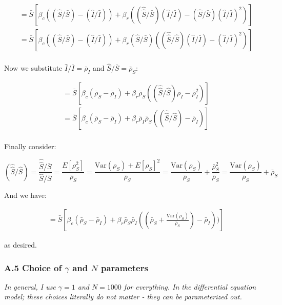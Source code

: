 \[
\begin{aligned}
&= \bar S \left[ \beta_c ((\hat S/\bar S) - (\hat I/\bar I))
    + \beta_r ((\hat{\hat S} / \bar S) (\hat I / \bar I)
    - (\hat S / \bar S) (\hat I / \bar I )^2) \right ]\\
&= \bar S \left[ \beta_c ((\hat S/\bar S) - (\hat I/\bar I))
    + \beta_r (\hat S / \bar S) ((\hat{\hat S} / \hat S) (\hat I / \bar I)
    -  (\hat I / \bar I )^2) \right ]\\
\end{aligned}
\]

Now we substitute \(\hat I / \bar I = \bar \rho_I\) and
\(\hat S / \bar S = \bar \rho_S\):

\[
\begin{aligned}
&= \bar S \left[ \beta_c (\bar\rho_S - \bar\rho_I)
    + \beta_r \bar\rho_S ((\hat{\hat S} / \hat S) \bar\rho_I - \bar\rho_I^2) \right ]\\
&= \bar S \left[ \beta_c (\bar\rho_S - \bar\rho_I)
    + \beta_r \bar\rho_I \bar\rho_S ((\hat{\hat S} / \hat S) - \bar\rho_I) \right ]\\
\end{aligned}
\]

Finally consider:

\[
(\hat{\hat S} / \hat S) = \frac{\hat{\hat S}/\bar S}{\hat S /\bar S} = \frac{E[\rho_S^2]}{\bar\rho_S}
= \frac{\text{Var}(\rho_S) + E[\rho_S]^2}{\bar\rho_S}
= \frac{\text{Var}(\rho_S)}{\bar\rho_S} + \frac{\bar\rho_S^2}{\bar\rho_S}
= \frac{\text{Var}(\rho_S)}{\bar\rho_S} + \bar\rho_S
\]

And we have:

\[
\begin{aligned}
&= \bar S \left[
    \beta_c (\bar\rho_S - \bar\rho_I)
    + \beta_r \bar\rho_S \bar\rho_I((\bar\rho_S + \frac{\text{Var}(\rho_S)}{\bar\rho_S})
        - \bar\rho_I))
\right]
\end{aligned}
\]

as desired.

\subsubsection{\texorpdfstring{A.5 Choice of \(\gamma\) and \(N\)
parameters}{A.5 Choice of \textbackslash gamma and N parameters}}\label{a.5-choice-of-gamma-and-n-parameters}

\emph{In general, I use \(\gamma = 1\) and \(N = 1000\) for everything.
In the differential equation model; these choices literally do not
matter - they can be parameterized out.}


